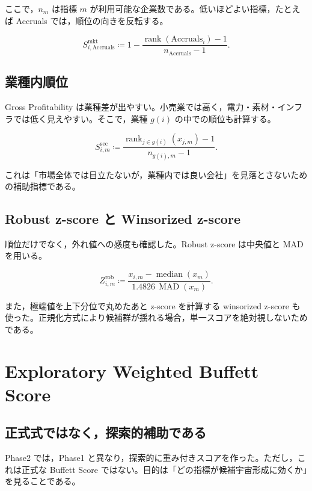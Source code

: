 \documentclass[a4paper,10pt]{article}
\newcommand{\Acc}{\mathrm{Accruals}}
\newcommand{\rank}{\operatorname{rank}}
\newcommand{\median}{\operatorname{median}}
\newcommand{\MAD}{\operatorname{MAD}}
\newcommand{\1}{\mathbf{1}}
\begin{document}
ここで，$n_m$ は指標 $m$ が利用可能な企業数である。低いほどよい指標，たとえば Accruals では，順位の向きを反転する。

\begin{equation}
S_{i,\Acc}^{\mathrm{mkt}} \coloneqq 1-\frac{\rank(\Acc_i)-1}{n_{\Acc}-1} .
\label{eq:accrual-score}
\end{equation}

\subsection{業種内順位}
Gross Profitability は業種差が出やすい。小売業では高く，電力・素材・インフラでは低く見えやすい。そこで，業種 $g(i)$ の中での順位も計算する。

\begin{equation}
S_{i,m}^{\mathrm{sec}} \coloneqq \frac{\rank_{j\in g(i)}(x_{j,m})-1}{n_{g(i),m}-1} .
\label{eq:sector-percentile}
\end{equation}

これは「市場全体では目立たないが，業種内では良い会社」を見落とさないための補助指標である。

\subsection{Robust z-score と Winsorized z-score}
順位だけでなく，外れ値への感度も確認した。Robust z-score は中央値と MAD を用いる。

\begin{equation}
Z_{i,m}^{\mathrm{rob}} \coloneqq \frac{x_{i,m}-\median(x_m)}{1.4826\,\MAD(x_m)} .
\label{eq:robust-z}
\end{equation}

また，極端値を上下分位で丸めたあと z-score を計算する winsorized z-score も使った。正規化方式により候補群が揺れる場合，単一スコアを絶対視しないためである。

\section{Exploratory Weighted Buffett Score}

\subsection{正式式ではなく，探索的補助である}
Phase2 では，Phase1 と異なり，探索的に重み付きスコアを作った。ただし，これは正式な Buffett Score ではない。目的は「どの指標が候補宇宙形成に効くか」を見ることである。
\end{document}
